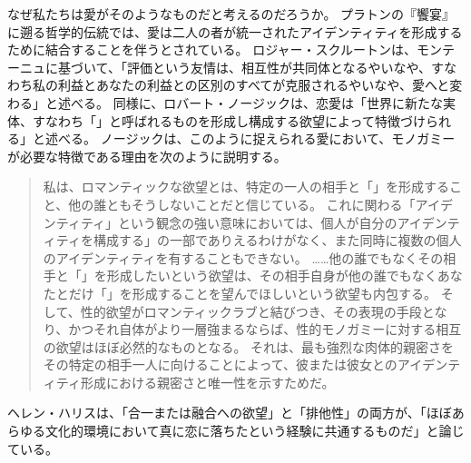 \documentclass[paper=a4,book,openany]{jlreq}
\newcommand{\ig}[1]{}           %
\begin{document}
なぜ私たちは愛がそのようなものだと考えるのだろうか。
プラトンの『饗宴』に遡る哲学的伝統では、愛は二人の者が統一されたアイデンティティを形成するために結合することを伴うとされている。
ロジャー・スクルートンは、モンテーニュに基づいて、「評価という友情は、相互性が共同体となるやいなや、すなわち私の利益とあなたの利益との区別のすべてが克服されるやいなや、愛へと変わる」と述べる。
同様に、ロバート・ノージックは、恋愛は「世界に新たな実体、すなわち「」と呼ばれるものを形成し構成する欲望によって特徴づけられる」と述べる\citep[p.230]{scruton06:_sexual_desir}。
ノージックは、このように捉えられる愛において、モノガミーが必要な特徴である理由を次のように説明する。

\begin{quote}
私は、ロマンティックな欲望とは、特定の一人の相手と「」を形成すること、他の誰ともそうしないことだと信じている。
これに関わる「アイデンティティ」という観念の強い意味においては、個人が自分のアイデンティティを構成する」の一部でありえるわけがなく、また同時に複数の個人のアイデンティティを有することもできない。
……他の誰でもなくその相手と「」を形成したいという欲望は、その相手自身が他の誰でもなくあなたとだけ「」を形成することを望んでほしいという欲望も内包する。
そして、性的欲望がロマンティックラブと結びつき、その表現の手段となり、かつそれ自体がより一層強まるならば、性的モノガミーに対する相互の欲望はほぼ必然的なものとなる。
それは、最も強烈な肉体的親密さをその特定の相手一人に向けることによって、彼または彼女とのアイデンティティ形成における親密さと唯一性を示すためだ。
\citep[p.89]{nozick89:_examined_life}
\end{quote}

ヘレン・ハリス\ig{Helen Harris}は、「合一または融合への欲望」と「排他性」の両方が、「ほぼあらゆる文化的環境において真に恋に落ちたという経験に共通するものだ」と論じている\citep[pp.102--103]{harris95:_rethin_polyn_heter_relat}。
\end{document}
